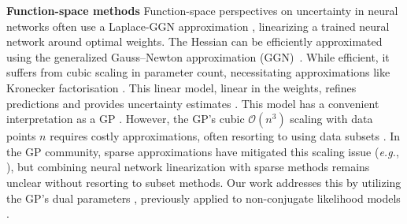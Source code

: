 \documentclass{article}
\makeatletter
\newcommand{\eg}{\textit{e.g.\@}\xspace}
\makeatother
\begin{document}
\textbf{Function-space methods}
Function-space perspectives on uncertainty in neural networks often use a Laplace-GGN approximation \citep{daxberger2021laplace}, linearizing a trained neural network around optimal weights. The Hessian can be efficiently approximated using the generalized Gauss--Newton approximation (GGN)~\cite{botev2017practical}. While efficient, it suffers from cubic scaling in parameter count, necessitating approximations like Kronecker factorisation \cite{martens2015optimizing, ritter2018kfac}. This linear model, linear in the weights, refines predictions and provides uncertainty estimates \citep{immer2021scalable}. This model has a convenient interpretation as a GP \cite{immer2021scalable, khan2019approximate, maddox2021fast}.
%
However, the GP's cubic $\mathcal{O}(n^3)$ scaling with data points $n$ requires costly approximations, often resorting to using data subsets \cite{immer2021scalable}. In the GP community, sparse approximations have mitigated this scaling issue (\eg, \cite{titsias2009variational,hensman2013gaussian}), but combining neural network linearization with sparse methods remains unclear without resorting to subset methods. Our work addresses this by utilizing the GP's dual parameters \cite{csato2002sparse}, previously applied to non-conjugate likelihood models \cite{adam2021dual}.

%
\end{document}
